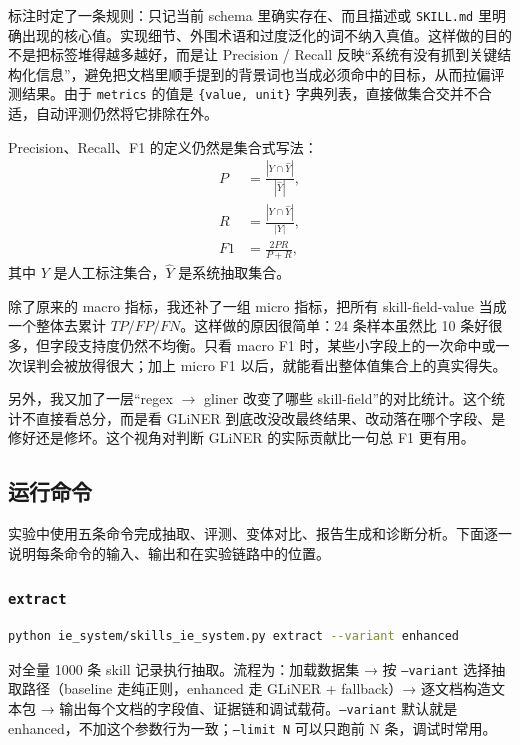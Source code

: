 标注时定了一条规则：只记当前 schema 里确实存在、而且描述或 \texttt{SKILL.md} 里明确出现的核心值。实现细节、外围术语和过度泛化的词不纳入真值。这样做的目的不是把标签堆得越多越好，而是让 Precision / Recall 反映“系统有没有抓到关键结构化信息”，避免把文档里顺手提到的背景词也当成必须命中的目标，从而拉偏评测结果。由于 \texttt{metrics} 的值是 \texttt{\{value, unit\}} 字典列表，直接做集合交并不合适，自动评测仍然将它排除在外。

Precision、Recall、F1 的定义仍然是集合式写法：
\begin{align}
\label{eq:prf}
P &= \frac{|Y \cap \hat{Y}|}{|\hat{Y}|},\\
R &= \frac{|Y \cap \hat{Y}|}{|Y|},\\
F1 &= \frac{2PR}{P+R},
\end{align}
其中 $Y$ 是人工标注集合，$\hat{Y}$ 是系统抽取集合。

除了原来的 macro 指标，我还补了一组 micro 指标，把所有 skill-field-value 当成一个整体去累计 $TP/FP/FN$。这样做的原因很简单：24 条样本虽然比 10 条好很多，但字段支持度仍然不均衡。只看 macro F1 时，某些小字段上的一次命中或一次误判会被放得很大；加上 micro F1 以后，就能看出整体值集合上的真实得失。

另外，我又加了一层“regex $\rightarrow$ gliner 改变了哪些 skill-field”的对比统计。这个统计不直接看总分，而是看 GLiNER 到底改没改最终结果、改动落在哪个字段、是修好还是修坏。这个视角对判断 GLiNER 的实际贡献比一句总 F1 更有用。

\subsection{运行命令}

实验中使用五条命令完成抽取、评测、变体对比、报告生成和诊断分析。下面逐一说明每条命令的输入、输出和在实验链路中的位置。

\subsubsection{\texttt{extract}}

\begin{lstlisting}[language=bash]
python ie_system/skills_ie_system.py extract --variant enhanced
\end{lstlisting}

对全量 1000 条 skill 记录执行抽取。流程为：加载数据集 → 按 \texttt{--variant} 选择抽取路径（baseline 走纯正则，enhanced 走 GLiNER + fallback）→ 逐文档构造文本包 → 输出每个文档的字段值、证据链和调试载荷。\texttt{--variant} 默认就是 enhanced，不加这个参数行为一致；\texttt{--limit N} 可以只跑前 N 条，调试时常用。

